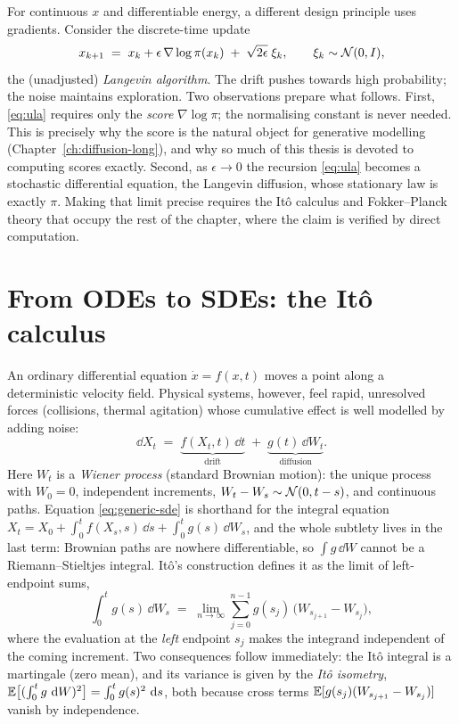 For continuous $x$ and differentiable energy, a different design
principle uses gradients. Consider the discrete-time update
\begin{equation}
  x_{k+1} \;=\; x_k + \epsilon\, \nabla \log \pi(x_k)
  \;+\; \sqrt{2\epsilon}\; \xi_k ,
  \qquad \xi_k \sim \mathcal{N}(0, I),
  \label{eq:ula}
\end{equation}
the (unadjusted) \emph{Langevin algorithm}. The drift pushes towards high
probability; the noise maintains exploration. Two observations prepare
what follows. First, \eqref{eq:ula} requires only the \emph{score}
$\nabla \log \pi$; the normalising constant is never needed. This is
precisely why the score is the natural object for generative modelling
(Chapter~\ref{ch:diffusion-long}), and why so much of this thesis is devoted
to computing scores exactly. Second, as $\epsilon \to 0$ the recursion
\eqref{eq:ula} becomes a stochastic differential equation, the Langevin
diffusion, whose stationary law is exactly $\pi$. Making that limit
precise requires the It\^o calculus and Fokker--Planck theory that occupy
the rest of the chapter, where the claim is verified by direct
computation.

\section{From ODEs to SDEs: the It\^o calculus}\label{sec:ode-to-sde}

An ordinary differential equation $\dot x = f(x, t)$ moves a point along
a deterministic velocity field. Physical systems, however, feel rapid,
unresolved forces (collisions, thermal agitation) whose cumulative effect
is well modelled by adding noise:
\begin{equation}
  \dd X_t \;=\; \underbrace{f(X_t, t)\,\dd t}_{\text{drift}}
  \;+\; \underbrace{g(t)\,\dd W_t}_{\text{diffusion}} .
  \label{eq:generic-sde}
\end{equation}
Here $W_t$ is a \emph{Wiener process} (standard Brownian motion): the
unique process with $W_0 = 0$, independent increments,
$W_t - W_s \sim \mathcal{N}(0, t-s)$, and continuous paths. Equation
\eqref{eq:generic-sde} is shorthand for the integral equation
$X_t = X_0 + \int_0^t f(X_s, s)\,\dd s + \int_0^t g(s)\,\dd W_s$, and the
whole subtlety lives in the last term: Brownian paths are nowhere
differentiable, so $\int g\,\dd W$ cannot be a Riemann--Stieltjes
integral. It\^o's construction \citep{ito1944stochastic} defines it as
the limit of left-endpoint sums,
\begin{equation}
  \int_0^t g(s)\, \dd W_s
  \;=\; \lim_{n \to \infty} \sum_{j=0}^{n-1}
        g(s_j)\,\big( W_{s_{j+1}} - W_{s_j} \big),
  \label{eq:ito-integral}
\end{equation}
where the evaluation at the \emph{left} endpoint $s_j$ makes the
integrand independent of the coming increment. Two consequences follow
immediately: the It\^o integral is a martingale (zero mean), and its
variance is given by the \emph{It\^o isometry},
$\mathbb{E}\big[ (\int_0^t g\,\,\mathrm{d} W)^2 \big] = \int_0^t g(s)^2\,\,\mathrm{d} s$, both
because cross terms $\mathbb{E}[g(s_j)(W_{s_{j+1}}-W_{s_j})]$ vanish by
independence.

